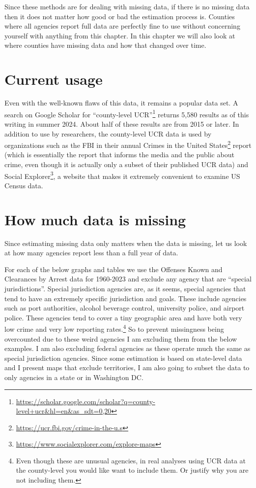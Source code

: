 \documentclass[
]{krantz}
\renewcommand{\href}[2]{#2\footnote{\url{#1}}}
\begin{document}
Since these methods are for dealing with missing data, if
there is no missing data then it does not matter how good or
bad the estimation process is. Counties where all agencies
report full data are perfectly fine to use without
concerning yourself with anything from this chapter. In this
chapter we will also look at where counties have missing
data and how that changed over time.

\section{Current usage}\label{current-usage}

Even with the well-known flaws of this data, it remains a
popular data set. A search on Google Scholar for
\href{https://scholar.google.com/scholar?q=county-level+ucr&hl=en&as_sdt=0,20}{``county-level
UCR''} returns 5,580 results as of this writing in summer
2024. About half of these results are from 2015 or later. In
addition to use by researchers, the county-level UCR data is
used by organizations such as the FBI in their annual
\href{https://ucr.fbi.gov/crime-in-the-u.s}{Crimes in the
United States} report (which is essentially the report that
informs the media and the public about crime, even though it
is actually only a subset of their published UCR data) and
\href{https://www.socialexplorer.com/explore-maps}{Social
Explorer}, a website that makes it extremely convenient to
examine US Census data.

\section{How much data is
missing}\label{how-much-data-is-missing}

Since estimating missing data only matters when the data is
missing, let us look at how many agencies report less than a
full year of data.

For each of the below graphs and tables we use the Offenses
Known and Clearances by Arrest data for 1960-2023 and
exclude any agency that are ``special jurisdictions''.
Special jurisdiction agencies are, as it seems, special
agencies that tend to have an extremely specific
jurisdiction and goals. These include agencies such as port
authorities, alcohol beverage control, university police,
and airport police. These agencies tend to cover a tiny
geographic area and have both very low crime and very low
reporting rates.\footnote{Even though these are unusual
  agencies, in real analyses using UCR data at the
  county-level you would like want to include them. Or
  justify why you are not including them.} So to prevent
missingness being overcounted due to these weird agencies I
am excluding them from the below examples. I am also
excluding federal agencies as these operate much the same as
special jurisdiction agencies. Since some estimation is
based on state-level data and I present maps that exclude
territories, I am also going to subset the data to only
agencies in a state or in Washington DC.
\end{document}
